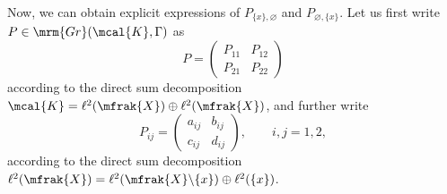 Now, we can obtain explicit expressions of $P_{\{x\},\varnothing}$ and $P_{\varnothing,\{x\}}$.
Let us first write $P\in \mrm{Gr}(\mcal{K},\Gamma)$ as
\begin{equation*}
	P=\left(
	\begin{matrix}
	P_{11} & P_{12} \\
	P_{21} & P_{22}
	\end{matrix}
	\right)
\end{equation*}
according to the direct sum decomposition $\mcal{K}=\ell^{2}(\mfrak{X})\oplus \ell^{2}(\mfrak{X})$, and further write
\begin{equation*}
	P_{ij}=\left(
	\begin{matrix}
		a_{ij} & b_{ij} \\
		c_{ij} & d_{ij}
	\end{matrix}
	\right),\qquad i,j=1,2,
\end{equation*}
according to the direct sum decomposition $\ell^{2}(\mfrak{X})=\ell^{2}(\mfrak{X}\backslash\{x\})\oplus \ell^{2}(\{x\})$.

